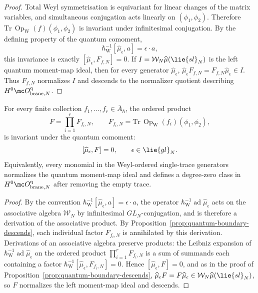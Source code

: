 \documentclass[11pt]{memoir}
\begin{document}
\begin{proof}
  Total Weyl symmetrisation is equivariant for linear changes of the matrix
  variables, and simultaneous conjugation acts linearly on
  $(\phi_1,\phi_2)$. Therefore
  $\mathrm{Tr}\,\operatorname{Op}_{\mathrm W}(f)(\phi_1,\phi_2)$ is invariant
  under infinitesimal conjugation. By the defining property of the quantum
  comoment,
  $$\hbar_{\mathrm{W}}^{-1}[\widehat\mu_\epsilon,a]=\epsilon\cdot a,$$
  this invariance is exactly $[\widehat\mu_\epsilon,F_{f,N}]=0$. If
  $I=\mathcal W_N\widehat\mu(\lie{sl}_N)$ is the left quantum moment-map ideal,
  then for every generator $\widehat\mu_\epsilon$,
  $\widehat\mu_\epsilon F_{f,N}=F_{f,N}\widehat\mu_\epsilon\in I$. Thus
  $F_{f,N}$ normalizes $I$ and descends to the normalizer quotient describing
  $H^0\mc O^{\mathrm q}_{\mathrm{brane},N}$.
\end{proof}

\begin{prop}\label{prop:quantum-boundary-descends-products}
  For every finite collection $f_1,\ldots,f_r\in\bar A_\hbar$, the ordered
  product
  $$F=\prod_{i=1}^{r}F_{f_i,N},
    \qquad F_{f_i,N}=\mathrm{Tr}\,\operatorname{Op}_{\mathrm W}(f_i)(\phi_1,\phi_2),$$
  is invariant under the quantum comoment:
  $$[\widehat\mu_\epsilon,F]=0,\qquad \epsilon\in\lie{gl}_N.$$
  Equivalently, every monomial in the Weyl-ordered single-trace generators
  normalizes the quantum moment-map ideal and defines a degree-zero class in
  $H^0\mc O^{\mathrm q}_{\mathrm{brane},N}$ after removing the empty trace.
\end{prop}

\begin{proof}
  By the convention \(\hbar_{\mathrm{W}}^{-1}[\widehat\mu_\epsilon,a]=\epsilon\cdot a\), the
  operator \(\hbar_{\mathrm{W}}^{-1}\operatorname{ad}\widehat\mu_\epsilon\) acts on the
  associative algebra $\mathcal W_N$ by infinitesimal $GL_N$-conjugation, and
  is therefore a derivation of the associative product. By
  Proposition~\ref{prop:quantum-boundary-descends}, each individual factor
  $F_{f_i,N}$ is annihilated by this derivation. Derivations of an associative
  algebra preserve products: the Leibniz expansion of
  \(\hbar_{\mathrm{W}}^{-1}\operatorname{ad}\widehat\mu_\epsilon\) on the ordered product
  $\prod_{i=1}^{r}F_{f_i,N}$ is a sum of summands each containing a factor
  \(\hbar_{\mathrm{W}}^{-1}[\widehat\mu_\epsilon,F_{f_i,N}]=0\). Hence
  $[\widehat\mu_\epsilon,F]=0$, and as in the proof of
  Proposition~\ref{prop:quantum-boundary-descends},
  $\widehat\mu_\epsilon F=F\widehat\mu_\epsilon\in
   \mathcal W_N\widehat\mu(\lie{sl}_N)$, so $F$ normalizes the left moment-map
  ideal and descends.
\end{proof}
\end{document}
